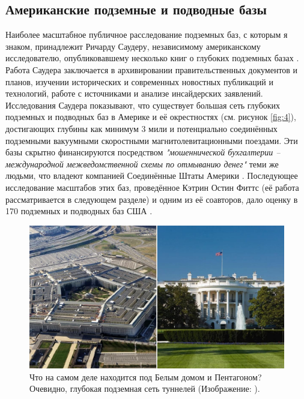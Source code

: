 \documentclass[10pt,twocolumn,letterpaper]{article}
\begin{document}
\subsection{Американские подземные и подводные базы}

Наиболее масштабное публичное расследование подземных баз, с которым я знаком, принадлежит Ричарду Саудеру, независимому американскому исследователю, опубликовавшему несколько книг о глубоких подземных базах \cite{22}. Работа Саудера заключается в архивировании правительственных документов и планов, изучении исторических и современных новостных публикаций и технологий, работе с источниками и анализе инсайдерских заявлений. Исследования Саудера показывают, что существует большая сеть глубоких подземных и подводных баз в Америке и её окрестностях (см. рисунок \ref{fig:4}), достигающих глубины как минимум 3 мили и потенциально соединённых подземными вакуумными скоростными магнитолевитационными поездами. Эти базы скрытно финансируются посредством \textit{"мошеннической бухгалтерии – международной межведомственной схемы по отмыванию денег"} теми же людьми, что владеют компанией Соединённые Штаты Америки \cite{22}. Последующее исследование масштабов этих баз, проведённое Кэтрин Остин Фиттс (её работа рассматривается в следующем разделе) и одним из её соавторов, дало оценку в 170 подземных и подводных баз США \cite{16,20}.

\begin{figure}[b]
\begin{center}
   \includegraphics[width=1\linewidth]{penta.jpg}
\end{center}
   \caption{Что на самом деле находится под Белым домом и Пентагоном? Очевидно, глубокая подземная сеть туннелей (Изображение: \cite{31}).}
\label{fig:3}
\label{fig:onecol}
\end{figure}
\end{document}
